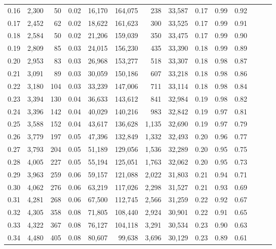 \begin{tabular}{rrrrrrrrrrrrrr}
0.16 &  2,300 &     50 &  0.02 &   16,170 &  164,075 &     238 &  33,587 &  0.17 &  0.99 &      0.92 \\
0.17 &  2,452 &     62 &  0.02 &   18,622 &  161,623 &     300 &  33,525 &  0.17 &  0.99 &      0.91 \\
0.18 &  2,584 &     50 &  0.02 &   21,206 &  159,039 &     350 &  33,475 &  0.17 &  0.99 &      0.90 \\
0.19 &  2,809 &     85 &  0.03 &   24,015 &  156,230 &     435 &  33,390 &  0.18 &  0.99 &      0.89 \\
0.20 &  2,953 &     83 &  0.03 &   26,968 &  153,277 &     518 &  33,307 &  0.18 &  0.98 &      0.87 \\
0.21 &  3,091 &     89 &  0.03 &   30,059 &  150,186 &     607 &  33,218 &  0.18 &  0.98 &      0.86 \\
0.22 &  3,180 &    104 &  0.03 &   33,239 &  147,006 &     711 &  33,114 &  0.18 &  0.98 &      0.84 \\
0.23 &  3,394 &    130 &  0.04 &   36,633 &  143,612 &     841 &  32,984 &  0.19 &  0.98 &      0.82 \\
0.24 &  3,396 &    142 &  0.04 &   40,029 &  140,216 &     983 &  32,842 &  0.19 &  0.97 &      0.81 \\
0.25 &  3,588 &    152 &  0.04 &   43,617 &  136,628 &   1,135 &  32,690 &  0.19 &  0.97 &      0.79 \\
0.26 &  3,779 &    197 &  0.05 &   47,396 &  132,849 &   1,332 &  32,493 &  0.20 &  0.96 &      0.77 \\
0.27 &  3,793 &    204 &  0.05 &   51,189 &  129,056 &   1,536 &  32,289 &  0.20 &  0.95 &      0.75 \\
0.28 &  4,005 &    227 &  0.05 &   55,194 &  125,051 &   1,763 &  32,062 &  0.20 &  0.95 &      0.73 \\
0.29 &  3,963 &    259 &  0.06 &   59,157 &  121,088 &   2,022 &  31,803 &  0.21 &  0.94 &      0.71 \\
0.30 &  4,062 &    276 &  0.06 &   63,219 &  117,026 &   2,298 &  31,527 &  0.21 &  0.93 &      0.69 \\
0.31 &  4,281 &    268 &  0.06 &   67,500 &  112,745 &   2,566 &  31,259 &  0.22 &  0.92 &      0.67 \\
0.32 &  4,305 &    358 &  0.08 &   71,805 &  108,440 &   2,924 &  30,901 &  0.22 &  0.91 &      0.65 \\
0.33 &  4,322 &    367 &  0.08 &   76,127 &  104,118 &   3,291 &  30,534 &  0.23 &  0.90 &      0.63 \\
0.34 &  4,480 &    405 &  0.08 &   80,607 &   99,638 &   3,696 &  30,129 &  0.23 &  0.89 &      0.61 \\

\end{tabular}
